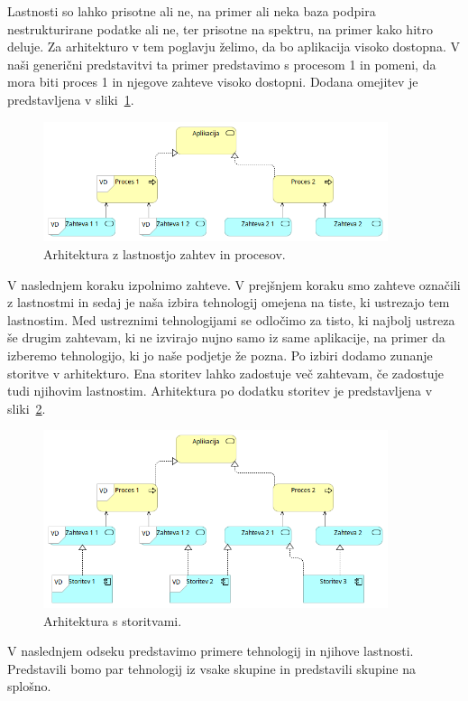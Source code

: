 Lastnosti so lahko prisotne ali ne, na primer ali neka baza podpira nestrukturirane podatke ali ne,
ter prisotne na spektru, na primer kako hitro deluje.
Za arhitekturo v tem poglavju želimo, da bo aplikacija visoko dostopna.
V naši generični predstavitvi ta primer predstavimo s procesom 1 in pomeni,
da mora biti proces 1 in njegove zahteve visoko dostopni.
Dodana omejitev je predstavljena v sliki~\ref{fig:generic-arch-application-labels}.

\begin{figure}[H]
    \centering
    \includegraphics[width=0.9\textwidth]{img/gradnja/generic-arch-application-labels.png}
    \caption{Arhitektura z lastnostjo zahtev in procesov.}
    \label{fig:generic-arch-application-labels}
\end{figure}

V naslednjem koraku izpolnimo zahteve.
V prejšnjem koraku smo zahteve označili z lastnostmi in sedaj je naša
izbira tehnologij omejena na tiste, ki ustrezajo tem lastnostim.
Med ustreznimi tehnologijami se odločimo za tisto,
ki najbolj ustreza še drugim zahtevam, ki ne izvirajo nujno samo iz
same aplikacije, na primer da izberemo tehnologijo, ki jo naše podjetje
že pozna.
Po izbiri dodamo zunanje storitve v arhitekturo.
Ena storitev lahko zadostuje več zahtevam,
če zadostuje tudi njihovim lastnostim.
Arhitektura po dodatku storitev je predstavljena v sliki~\ref{fig:generic-services}.

\begin{figure}[H]
    \centering
    \includegraphics[width=0.9\textwidth]{img/gradnja/generic-services.png}
    \caption{Arhitektura s storitvami.}
    \label{fig:generic-services}
\end{figure}

V naslednjem odseku predstavimo primere tehnologij in njihove lastnosti.
Predstavili bomo par tehnologij iz vsake skupine in predstavili skupine na splošno.
